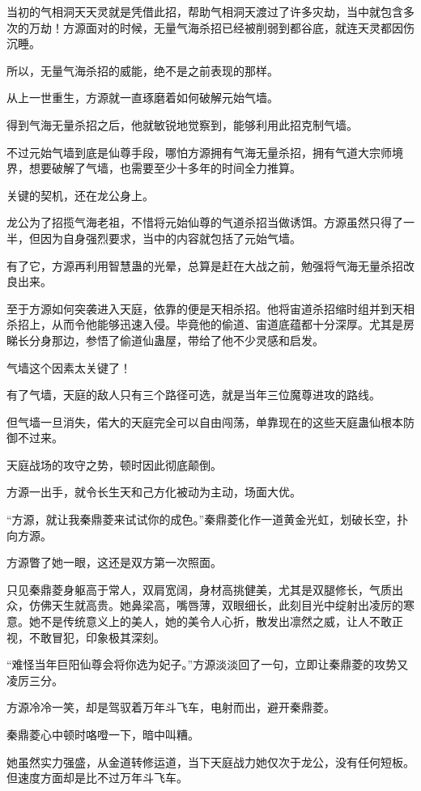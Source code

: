 \begin{this_body}
当初的气相洞天天灵就是凭借此招，帮助气相洞天渡过了许多灾劫，当中就包含多次的万劫！方源面对的时候，无量气海杀招已经被削弱到都谷底，就连天灵都因伤沉睡。

所以，无量气海杀招的威能，绝不是之前表现的那样。

从上一世重生，方源就一直琢磨着如何破解元始气墙。

得到气海无量杀招之后，他就敏锐地觉察到，能够利用此招克制气墙。

不过元始气墙到底是仙尊手段，哪怕方源拥有气海无量杀招，拥有气道大宗师境界，想要破解了气墙，也需要至少十多年的时间全力推算。

关键的契机，还在龙公身上。

龙公为了招揽气海老祖，不惜将元始仙尊的气道杀招当做诱饵。方源虽然只得了一半，但因为自身强烈要求，当中的内容就包括了元始气墙。

有了它，方源再利用智慧蛊的光晕，总算是赶在大战之前，勉强将气海无量杀招改良出来。

至于方源如何突袭进入天庭，依靠的便是天相杀招。他将宙道杀招缩时组并到天相杀招上，从而令他能够迅速入侵。毕竟他的偷道、宙道底蕴都十分深厚。尤其是房睇长分身那边，参悟了偷道仙蛊屋，带给了他不少灵感和启发。

气墙这个因素太关键了！

有了气墙，天庭的敌人只有三个路径可选，就是当年三位魔尊进攻的路线。

但气墙一旦消失，偌大的天庭完全可以自由闯荡，单靠现在的这些天庭蛊仙根本防御不过来。

天庭战场的攻守之势，顿时因此彻底颠倒。

方源一出手，就令长生天和己方化被动为主动，场面大优。

“方源，就让我秦鼎菱来试试你的成色。”秦鼎菱化作一道黄金光虹，划破长空，扑向方源。

方源瞥了她一眼，这还是双方第一次照面。

只见秦鼎菱身躯高于常人，双肩宽阔，身材高挑健美，尤其是双腿修长，气质出众，仿佛天生就高贵。她鼻梁高，嘴唇薄，双眼细长，此刻目光中绽射出凌厉的寒意。她不是传统意义上的美人，她的美令人心折，散发出凛然之威，让人不敢正视，不敢冒犯，印象极其深刻。

“难怪当年巨阳仙尊会将你选为妃子。”方源淡淡回了一句，立即让秦鼎菱的攻势又凌厉三分。

方源冷冷一笑，却是驾驭着万年斗飞车，电射而出，避开秦鼎菱。

秦鼎菱心中顿时咯噔一下，暗中叫糟。

她虽然实力强盛，从金道转修运道，当下天庭战力她仅次于龙公，没有任何短板。但速度方面却是比不过万年斗飞车。


\end{this_body}

